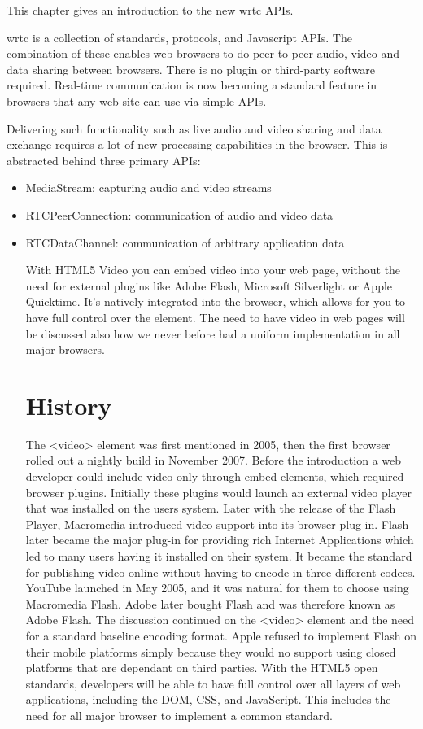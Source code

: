 
This chapter gives an introduction to the new \gls{wrtc} APIs.

\gls{wrtc} is a collection of standards, protocols, and Javascript APIs. The combination of these enables web browsers to do peer-to-peer audio, video and data sharing between browsers. There is no plugin or third-party software required. Real-time communication is now becoming a standard feature in browsers that any web site can use via simple APIs.

Delivering such functionality such as live audio and video sharing and data exchange requires a lot of new processing capabilities in the browser. This is abstracted behind three primary APIs:

\begin{itemize}
\item MediaStream: capturing audio and video streams
\item RTCPeerConnection: communication of audio and video data
\item RTCDataChannel: communication of arbitrary application data






With HTML5 Video you can embed video into your web page, without the need for external plugins like Adobe Flash, Microsoft Silverlight or Apple Quicktime. It’s natively integrated into the browser, which allows for you to have full control over the element. The need to have video in web pages will be discussed also how we never before had a uniform implementation in all major browsers.

\section{History}
The <video> element was first mentioned in 2005, then the first browser rolled out a nightly build in November 2007. Before the introduction a web developer could include video only through  embed elements, which required browser plugins. Initially these plugins would launch an external video player that was installed on the users system. Later with the release of the Flash Player, Macromedia introduced video support into its browser plug-in. Flash later became the major plug-in for providing rich Internet Applications which led to many users having it installed on their system. It became the standard for publishing video online without having to encode in three different codecs. YouTube launched in May 2005, and it was natural for them to choose using Macromedia Flash. Adobe later bought Flash and was therefore known as Adobe Flash. The discussion continued on the <video> element and the need for a standard baseline encoding format. Apple refused to implement Flash on their mobile platforms simply because they would no support using closed platforms that are dependant on third parties. With the HTML5 open standards, developers will be able to have full control over all layers of web applications, including the DOM, CSS, and JavaScript. This includes the need for all major browser to implement a common standard.


\end{itemize}
